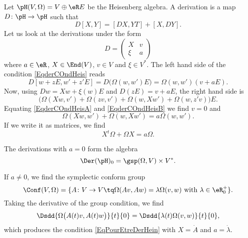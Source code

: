 Let $\pH(V,\Omega)=V\oplus\eR E$ be the Heisenberg algebra. A derivation is a map $D\colon \pH \to \pH$ such that
\begin{equation}        \label{EqderCOndHeis}
    D[X,Y]=[DX,YT]+[X,DY].
\end{equation}
Let us look at the derivations under the form
\begin{equation}
    D=\begin{pmatrix}
        X   &   v   \\
        \xi &   a
    \end{pmatrix}
\end{equation}
where $a\in\eR$, $X\in\End(V)$, $v\in V$ and $\xi\in V^*$. The left hand side of the condition \eqref{EqderCOndHeis} reads
\begin{equation}    \label{EqderCOndHeisA}
    D[w+zE,w'+z'E]=D\big( \Omega(w,w')E \big)=\Omega(w,w')(v+aE).
\end{equation}
Now, using $Dw=Xw+\xi(w)E$ and $D(zE)=v+aE$, the right hand side is
\begin{equation}    \label{EqderCOndHeisB}
    \big( \Omega(Xw,v')+\Omega(zv,v')+\Omega(w,Xw')+\Omega(w,z'v) \big)E.
\end{equation}
Equating \eqref{EqderCOndHeisA} and \eqref{EqderCOndHeisB} we find $v=0$ and
\begin{equation}        \label{EqPourEtreDerHein}
    \Omega(Xw,w')+\Omega(w,Xw')=a\Omega(w,w').
\end{equation}
If we write it as matrices, we find
\begin{equation}
    X^t\Omega+\Omega X=a\Omega.
\end{equation}

The derivations with $a=0$ form the algebra
\begin{equation}
    \Der(\pH)_0=\gsp(\Omega,V)\times V^*.
\end{equation}

If $a\neq 0$, we find the symplectic conform group
\begin{equation}
    \Conf(V,\Omega)=\{ A\colon V\to V\tq \Omega(Av,Aw)=\lambda\Omega(v,w)\text{ with }\lambda\in\eR_0^+ \}.
\end{equation}
Taking the derivative of the group condition, we find
\begin{equation}
    \Dsdd{ \Omega\big( A(t)v,A(t)w \big) }{t}{0}=\Dsdd{ \lambda(t)\Omega(v,w) }{t}{0},
\end{equation}
which produces the condition \eqref{EqPourEtreDerHein} with $X=\dot A$ and $a=\dot \lambda$.

